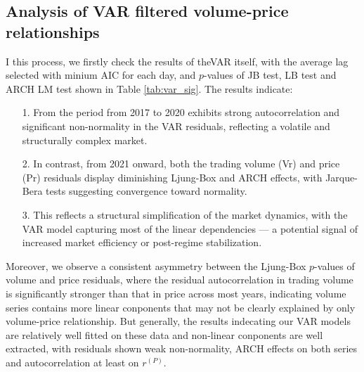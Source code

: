 \documentclass{elsarticle}
\begin{document}
\subsection{Analysis of VAR filtered volume-price relationships}\label{sec:var}
I this process, we firstly check the results of theVAR itself, with the average lag selected with minium AIC for each day, and $p$-values of JB test, LB test and ARCH LM test shown in Table \ref{tab:var_sig}. The results indicate: 
\begin{itemize}
  \item[1. ] From the period from 2017 to 2020 exhibits strong autocorrelation and significant non-normality in the VAR residuals, reflecting a volatile and structurally complex market.
  \item[2. ] In contrast, from 2021 onward, both the trading volume (Vr) and price (Pr) residuals display diminishing Ljung-Box and ARCH effects, with Jarque-Bera tests suggesting convergence toward normality.
  \item[3. ] This reflects a structural simplification of the market dynamics, with the VAR model capturing most of the linear dependencies — a potential signal of increased market efficiency or post-regime stabilization.
\end{itemize}
Moreover, we observe a consistent asymmetry between the Ljung-Box $p$-values of volume and price residuals, where the residual autocorrelation in trading volume is significantly stronger than that in price across most years, indicating volume series contains more linear conponents that may not be clearly explained by only volume-price relationship. But generally, the results indecating our VAR models are relatively well fitted on these data and non-linear conponents are well extracted, with residuals shown weak non-normality, ARCH effects on both series and autocorrelation at least on $r^{(P)}$.
\end{document}
